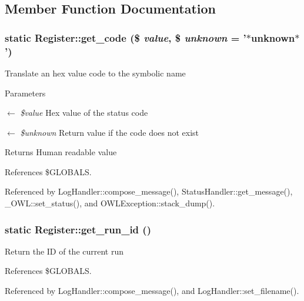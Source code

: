 \subsection{Member Function Documentation}
\subsubsection[{get\_\-code}]{\setlength{\rightskip}{0pt plus 5cm}static Register::get\_\-code (\$ {\em value}, \/  \$ {\em unknown} = {\ttfamily '$\ast$unknown$\ast$'})}\label{classRegister_abd8556b87ac48f8d8b3abeef6285c8f5}
Translate an hex value code to the symbolic name


\begin{DoxyParams}{Parameters}
\item[\mbox{$\leftarrow$} {\em \$value}]Hex value of the status code \item[\mbox{$\leftarrow$} {\em \$unknown}]Return value if the code does not exist \end{DoxyParams}
\begin{DoxyReturn}{Returns}
Human readable value 
\end{DoxyReturn}


References \$GLOBALS.



Referenced by LogHandler::compose\_\-message(), StatusHandler::get\_\-message(), \_\-OWL::set\_\-status(), and OWLException::stack\_\-dump().

\subsubsection[{get\_\-run\_\-id}]{\setlength{\rightskip}{0pt plus 5cm}static Register::get\_\-run\_\-id ()}\label{classRegister_a041706fafb409a31f125d2075501e82e}
Return the ID of the current run 

References \$GLOBALS.



Referenced by LogHandler::compose\_\-message(), and LogHandler::set\_\-filename().


